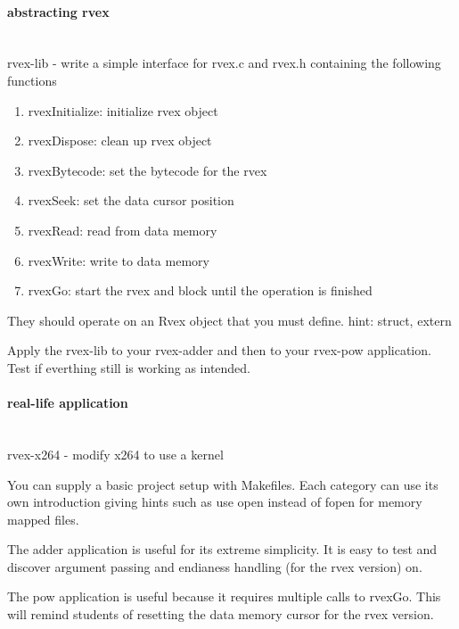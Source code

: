 \paragraph{abstracting rvex} \hfill \\
rvex-lib - write a simple interface for rvex.c and rvex.h containing the following functions
\begin{enumerate}
	\item rvexInitialize: initialize rvex object
	\item rvexDispose: clean up rvex object
	\item rvexBytecode: set the bytecode for the rvex
	\item rvexSeek: set the data cursor position
	\item rvexRead: read from data memory
	\item rvexWrite: write to data memory
	\item rvexGo: start the rvex and block until the operation is finished
\end{enumerate}
They should operate on an Rvex object that you must define. hint: struct, extern

Apply the rvex-lib to your rvex-adder and then to your rvex-pow application. Test if everthing still is working as intended. 

\paragraph{real-life application} \hfill \\
rvex-x264 - modify x264 to use a kernel

You can supply a basic project setup with Makefiles. Each category can use its own introduction giving hints such as use open instead of fopen for memory mapped files.

The adder application is useful for its extreme simplicity.
It is easy to test and discover argument passing and endianess handling (for the rvex version) on. 

The pow application is useful because it requires multiple calls to rvexGo. 
This will remind students of resetting the data memory cursor for the rvex version. 

